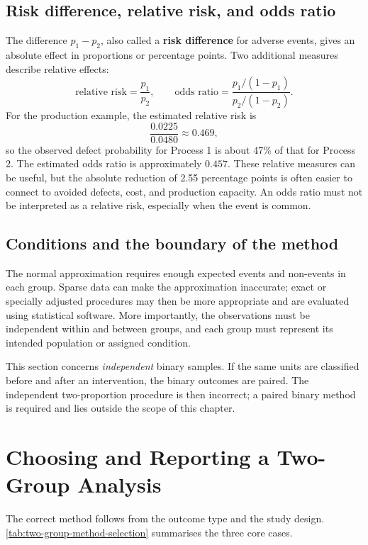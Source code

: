 \subsection{Risk difference, relative risk, and odds ratio}

The difference $p_1-p_2$, also called a \textbf{risk difference} for adverse events, gives an absolute effect in proportions or percentage points. Two additional measures describe relative effects:
\[
\text{relative risk}
=\frac{p_1}{p_2},
\qquad
\text{odds ratio}
=
\frac{p_1/(1-p_1)}{p_2/(1-p_2)}.
\]
For the production example, the estimated relative risk is
\[
\frac{0.0225}{0.0480}\approx0.469,
\]
so the observed defect probability for Process 1 is about 47\% of that for Process 2. The estimated odds ratio is approximately $0.457$. These relative measures can be useful, but the absolute reduction of 2.55 percentage points is often easier to connect to avoided defects, cost, and production capacity. An odds ratio must not be interpreted as a relative risk, especially when the event is common.

\subsection{Conditions and the boundary of the method}

The normal approximation requires enough expected events and non-events in each group. Sparse data can make the approximation inaccurate; exact or specially adjusted procedures may then be more appropriate and are evaluated using statistical software. More importantly, the observations must be independent within and between groups, and each group must represent its intended population or assigned condition.

This section concerns \emph{independent} binary samples. If the same units are classified before and after an intervention, the binary outcomes are paired. The independent two-proportion procedure is then incorrect; a paired binary method is required and lies outside the scope of this chapter.

\section{Choosing and Reporting a Two-Group Analysis}
\label{sec:choosing-two-group-method}

The correct method follows from the outcome type and the study design. \autoref{tab:two-group-method-selection} summarises the three core cases.

